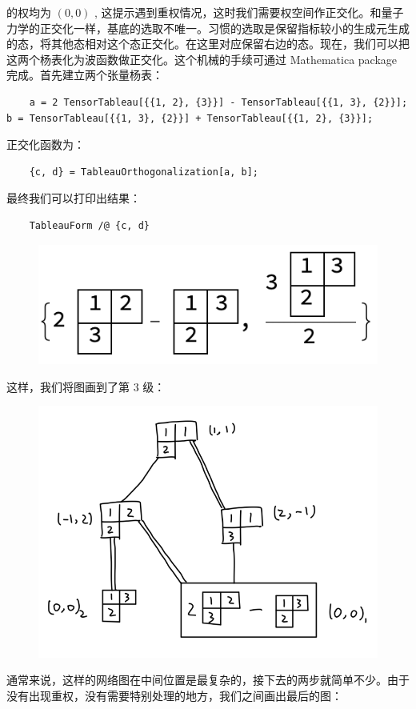 \documentclass[UTF8]{ctexart}
\begin{document}
\noindent 的权均为 $(0,0)$ , 这提示遇到重权情况，这时我们需要权空间作正交化。和量子力学的正交化一样，基底的选取不唯一。习惯的选取是保留指标较小的生成元生成的态，将其他态相对这个态正交化。在这里对应保留右边的态。现在，我们可以把这两个杨表化为波函数做正交化。这个机械的手续可通过 Mathematica package 完成。首先建立两个张量杨表：
\begin{verbatim}
	a = 2 TensorTableau[{{1, 2}, {3}}] - TensorTableau[{{1, 3}, {2}}];
b = TensorTableau[{{1, 3}, {2}}] + TensorTableau[{{1, 2}, {3}}];
\end{verbatim}
正交化函数为：
\begin{verbatim}
	{c, d} = TableauOrthogonalization[a, b];
\end{verbatim}
最终我们可以打印出结果：
\begin{verbatim}
	TableauForm /@ {c, d}
\end{verbatim}

\begin{figure}[H]
\begin{centering}
\includegraphics[width=0.4\linewidth]{include/O4}
\par\end{centering}
\end{figure}

\noindent 这样，我们将图画到了第 3 级：

\begin{figure}[H]
\begin{centering}
\includegraphics[width=0.5\linewidth]{include/T2}
\par\end{centering}
\end{figure}

\noindent 通常来说，这样的网络图在中间位置是最复杂的，接下去的两步就简单不少。由于没有出现重权，没有需要特别处理的地方，我们之间画出最后的图：
\end{document}
